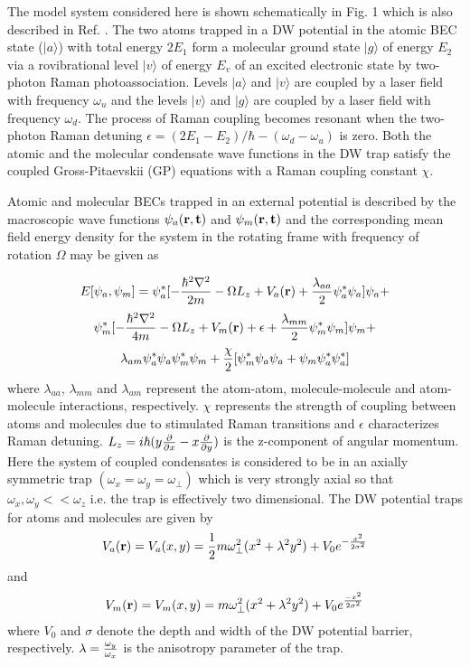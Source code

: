 \documentclass[10pt,a4paper]{article}
\begin{document}
The  model system considered here is shown schematically in Fig.
1 which is also described in Ref. \cite{Heinzen, M3}. The two atoms trapped in a DW potential 
in the atomic BEC state ($|a\rangle$) with total
energy $2E_1$ form a molecular ground state $|g\rangle$
of energy $E_2$ via a rovibrational level $|v\rangle$ of energy
$E_v$ of an excited electronic state by two-photon Raman photoassociation.
Levels $|a\rangle$ and $|v\rangle$ are coupled by a laser field
with frequency $\omega_u$ and the levels $|v\rangle$ and
$|g\rangle$ are coupled by a laser field with frequency
$\omega_d$. The process of Raman coupling becomes resonant when
the two-photon Raman detuning
$\epsilon=(2E_1-E_2)/\hbar-(\omega_d-\omega_u)$ is zero. Both the atomic and the molecular condensate
wave functions in the DW trap satisfy the coupled Gross-Pitaevskii (GP) equations with a
Raman coupling constant $\chi$.

Atomic and molecular BECs trapped in an external potential is
described by the macroscopic wave functions $\psi_a(\bf r, t)$ and
$\psi_m(\bf r, t)$ and the corresponding mean field energy density
for the system in the rotating frame with frequency of rotation
$\Omega$ may be given as

$$E[\psi_a,\psi_m]=\psi_a^*[-{\hbar^2\nabla^2\over 2m}-\Omega
L_z+V_a({\bf r})+{\lambda_{aa}\over 2}\psi_a^*\psi_a]\psi_a
+$$$$\psi_m^*[-{\hbar^2\nabla^2\over 4m}-\Omega L_z+V_m({\bf
r})+\epsilon+{\lambda_{mm}\over
2}\psi_m^*\psi_m]\psi_m+$$\begin{eqnarray}
\lambda_{am}\psi_a^*\psi_a\psi_m^*\psi_m+{\chi\over 2}
[\psi_m^*\psi_a\psi_a+\psi_m\psi_a^*\psi_a^*]\end{eqnarray} where
$\lambda_{aa}$, $\lambda_{mm}$ and $\lambda_{am}$ represent the
atom-atom, molecule-molecule and atom-molecule interactions,
respectively. $\chi$ represents the strength of coupling between
atoms and molecules due to stimulated Raman transitions and
$\epsilon$ characterizes Raman detuning.
$L_z=i\hbar(y{\partial\over
\partial x}-x{\partial\over
\partial y})$ is the z-component of angular momentum. Here the
system of coupled condensates is considered to be in an axially
symmetric trap $(\omega_x=\omega_y=\omega_\perp)$ which is very
strongly axial so that $\omega_x,\omega_y<<\omega_z$ i.e. the trap
is effectively two dimensional. The DW potential traps for atoms
and molecules are given by \begin{eqnarray}V_a({\bf
r})=V_a(x,y)={1\over 2}m\omega_\perp ^2 (x^2+\lambda^2
y^2)+V_0e^{-{x^2\over 2\sigma^2}}\end{eqnarray} and
\begin{eqnarray}V_m({\bf r})=V_m(x,y)=m\omega_\perp ^2 (x^2+\lambda^2 y^2)+V_0e^{{-x^2\over 2\sigma^2}}\end{eqnarray}
where $V_0$ and $\sigma$ denote the depth and width of the DW
potential barrier, respectively. $\lambda={\omega_y\over
\omega_x}$ is the anisotropy parameter of the trap.
\end{document}
